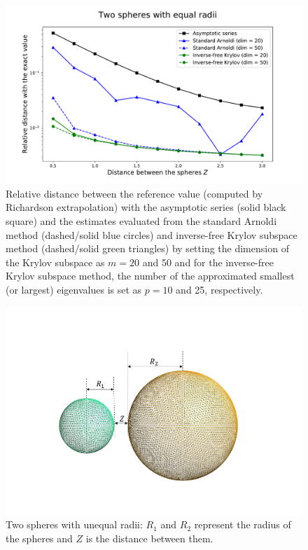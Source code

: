\begin{figure}[H]
    \includegraphics[scale = 0.7]{figures/relative_distance_equal_radii.pdf}
    \caption{Relative distance between the reference value (computed by Richardson extrapolation) with the asymptotic series (solid black square)  
    and the estimates evaluated from the standard Arnoldi method (dashed/solid blue circles) and inverse-free Krylov subspace method (dashed/solid green triangles) 
    by setting the dimension of the Krylov subspace as $m = 20$ and 50 and for the inverse-free
    Krylov subspace method, the number of the approximated smallest (or largest) eigenvalues is set as $p = 10$ and 25, respectively.}
    \label{equal_radii_rel_dist}
\end{figure}
 
\begin{figure}[H]
    \hspace*{2cm}\includegraphics[scale = 0.6]{figures/Grid_two_spheres_unequal_radii.png}
    \caption{Two spheres with unequal radii: $R_{1}$ and $R_{2}$ represent the radius of the spheres and $Z$ is the distance between them.}
    \label{Two spheres with unequal radii}
\end{figure}

